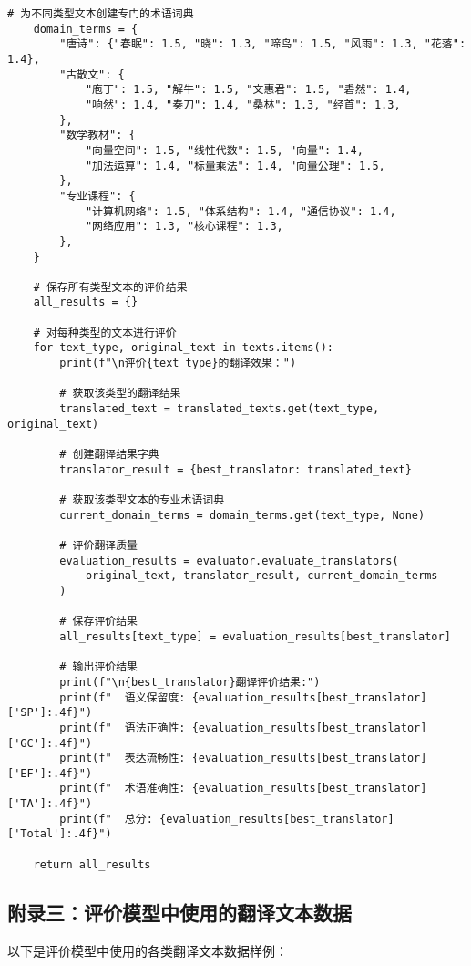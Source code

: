 \documentclass[bwprint]{cumcmthesis}
\begin{document}
\begin{appendices}
\begin{lstlisting}[style=pythonstyle, caption={问题三主函数}]
    # 为不同类型文本创建专门的术语词典
    domain_terms = {
        "唐诗": {"春眠": 1.5, "晓": 1.3, "啼鸟": 1.5, "风雨": 1.3, "花落": 1.4},
        "古散文": {
            "庖丁": 1.5, "解牛": 1.5, "文惠君": 1.5, "砉然": 1.4,
            "响然": 1.4, "奏刀": 1.4, "桑林": 1.3, "经首": 1.3,
        },
        "数学教材": {
            "向量空间": 1.5, "线性代数": 1.5, "向量": 1.4,
            "加法运算": 1.4, "标量乘法": 1.4, "向量公理": 1.5,
        },
        "专业课程": {
            "计算机网络": 1.5, "体系结构": 1.4, "通信协议": 1.4,
            "网络应用": 1.3, "核心课程": 1.3,
        },
    }

    # 保存所有类型文本的评价结果
    all_results = {}

    # 对每种类型的文本进行评价
    for text_type, original_text in texts.items():
        print(f"\n评价{text_type}的翻译效果：")
        
        # 获取该类型的翻译结果
        translated_text = translated_texts.get(text_type, original_text)

        # 创建翻译结果字典
        translator_result = {best_translator: translated_text}

        # 获取该类型文本的专业术语词典
        current_domain_terms = domain_terms.get(text_type, None)

        # 评价翻译质量
        evaluation_results = evaluator.evaluate_translators(
            original_text, translator_result, current_domain_terms
        )

        # 保存评价结果
        all_results[text_type] = evaluation_results[best_translator]

        # 输出评价结果
        print(f"\n{best_translator}翻译评价结果:")
        print(f"  语义保留度: {evaluation_results[best_translator]['SP']:.4f}")
        print(f"  语法正确性: {evaluation_results[best_translator]['GC']:.4f}")
        print(f"  表达流畅性: {evaluation_results[best_translator]['EF']:.4f}")
        print(f"  术语准确性: {evaluation_results[best_translator]['TA']:.4f}")
        print(f"  总分: {evaluation_results[best_translator]['Total']:.4f}")

    return all_results
\end{lstlisting}

\subsection{附录三：评价模型中使用的翻译文本数据}
以下是评价模型中使用的各类翻译文本数据样例：


\end{appendices}
\end{document}
